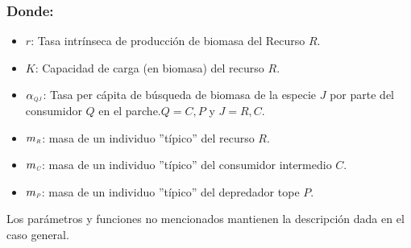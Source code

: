 \documentclass[a4paper,12pt]{article}
\newcommand{\C}{\textit{\tiny C}}
\newcommand{\R}{\textit{\tiny R}}
\begin{document}
\subsubsection*{Donde:}
\begin{itemize}
\item[]$r$: Tasa intr\'inseca de producci\'on de biomasa del Recurso $R$.
\item[]$K$: Capacidad de carga (en biomasa) del recurso $R$.
\item[]$\alpha_{\textit{\tiny QJ}} $: Tasa per c\'apita de b\'usqueda de biomasa de la especie $J$  por parte del consumidor $Q$ en el parche.$Q=C,P$ y $J=R,C$.
\item[]$m_\R$: masa de un individuo ''t\'ipico'' del recurso $R$.
\item[]$m_\C$: masa de un individuo ''t\'ipico'' del consumidor intermedio $C$.
\item[]$m_\textit{\tiny P}$: masa de un individuo ''t\'ipico'' del depredador tope $P$.
\end{itemize}
Los par\'ametros y funciones no mencionados mantienen la descripci\'on dada en el caso general.\\
\end{document}
